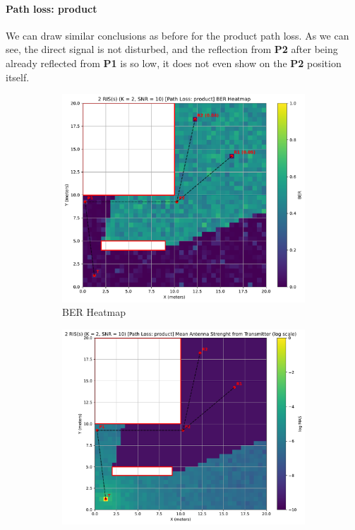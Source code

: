\paragraph*{Path loss: product}
We can draw similar conclusions as before for the product path loss. As we can see, the direct signal is not disturbed, and the reflection from \textbf{P2} after being already reflected from \textbf{P1} is so low, it does not even show on the \textbf{P2} position itself.

\begin{figure}[H]
  \centering
  \begin{subfigure}[b]{0.48\textwidth}
    \centering
    \includegraphics[width=\textwidth]{imgs/heatmap-simulations/2 RIS(s) (K = 2, SNR = 10) [Path Loss: product] BER Heatmap.pdf}
    \caption{BER Heatmap}
  \end{subfigure}
  \hfill
  \begin{subfigure}[b]{0.48\textwidth}
    \centering
    \includegraphics[width=\textwidth]{imgs/heatmap-simulations/2 RIS(s) (K = 2, SNR = 10) [Path Loss: product] Mean Antenna Strenght from Transmitter (log scale).pdf}

\end{subfigure}
\end{figure}
